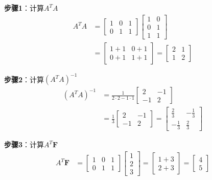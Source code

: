 \documentclass[12pt,a4paper]{article}
\begin{document}
\textbf{步骤1}：计算$A^T A$
\begin{align}
A^T A &= \begin{bmatrix} 1 & 0 & 1 \\ 0 & 1 & 1 \end{bmatrix} \begin{bmatrix} 1 & 0 \\ 0 & 1 \\ 1 & 1 \end{bmatrix} \\
&= \begin{bmatrix} 1+1 & 0+1 \\ 0+1 & 1+1 \end{bmatrix} = \begin{bmatrix} 2 & 1 \\ 1 & 2 \end{bmatrix}
\end{align}

\textbf{步骤2}：计算$(A^T A)^{-1}$
\begin{align}
(A^T A)^{-1} &= \frac{1}{2 \cdot 2 - 1 \cdot 1} \begin{bmatrix} 2 & -1 \\ -1 & 2 \end{bmatrix} \\
&= \frac{1}{3} \begin{bmatrix} 2 & -1 \\ -1 & 2 \end{bmatrix} = \begin{bmatrix} \frac{2}{3} & -\frac{1}{3} \\ -\frac{1}{3} & \frac{2}{3} \end{bmatrix}
\end{align}

\textbf{步骤3}：计算$A^T \bm{F}$
\begin{align}
A^T \bm{F} &= \begin{bmatrix} 1 & 0 & 1 \\ 0 & 1 & 1 \end{bmatrix} \begin{bmatrix} 1 \\ 2 \\ 3 \end{bmatrix} = \begin{bmatrix} 1+3 \\ 2+3 \end{bmatrix} = \begin{bmatrix} 4 \\ 5 \end{bmatrix}
\end{align}
\end{document}
